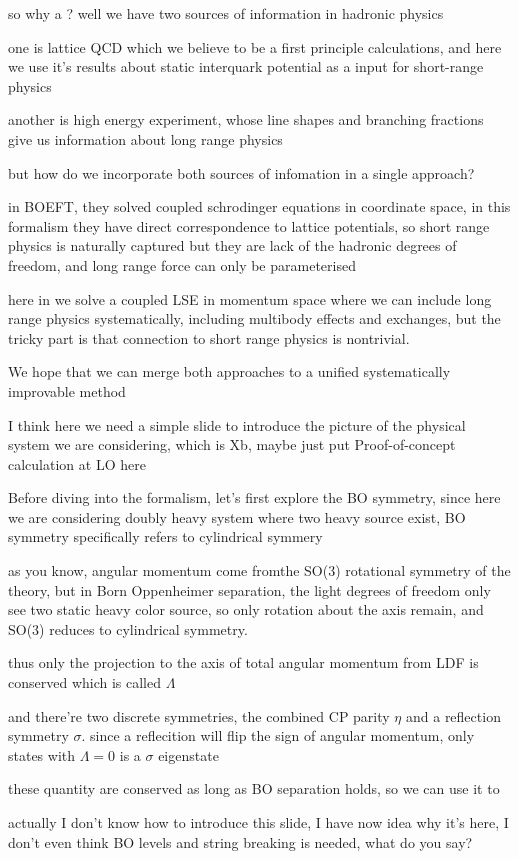 \documentclass[11pt,a4paper]{article}
\newcommand{\draftcue}[1]{\begin{private}#1\end{private}}
\begin{document}
so why a \BOchiEFT? well we have two sources of information in hadronic physics

one is lattice QCD which we believe to be a first principle calculations, and here we use it's results about static interquark potential as a input for short-range physics

another is high energy experiment, whose line shapes and branching fractions give us information about long range physics

but how do we incorporate both sources of infomation in a single approach?

in BOEFT, they solved coupled schrodinger equations in coordinate space, in this formalism they have direct correspondence to lattice potentials, so short range physics is naturally captured
but they are lack of the hadronic degrees of freedom, and long range force can only be parameterised

here in \BOchiEFT we solve a coupled LSE in momentum space
where we can include long range physics systematically, including multibody effects and exchanges, but the tricky part is that connection to short range physics is nontrivial.

We hope that we can merge both approaches to a unified systematically improvable method

\draftcue{I think here we need a simple slide to introduce the picture of the physical system we are considering, which is Xb, maybe just put Proof-of-concept \BOchiEFT{} calculation at LO here}

Before diving into the formalism, let's first explore the BO symmetry, since here we are considering doubly heavy system where two heavy source exist, BO symmetry specifically refers to cylindrical symmery

as you know, angular momentum come fromthe SO(3) rotational symmetry of the theory, but in Born Oppenheimer separation, the light degrees of freedom only see two static heavy color source, so only rotation about the axis remain, and SO(3) reduces to cylindrical symmetry.

thus only the projection to the axis of total angular momentum from LDF is conserved which is called $\Lambda$

and there're two discrete symmetries, the combined CP parity $\eta$ and a reflection symmetry $\sigma$. since a reflecition will flip the sign of angular momentum, only states with $\Lambda=0$ is a $\sigma$ eigenstate

these quantity are conserved as long as BO separation holds, so we can use it to \draftcue{actually I don't know how to  introduce this slide, I have now idea why it's here, I don't even think BO levels and string breaking is needed, what do you say?}
\end{document}

